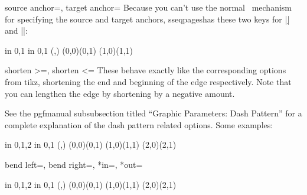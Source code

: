 \documentclass{ltxdoc}
\newenvironment{manualentry}[1]{
    \begin{pgfmanualentry}
    \pgfmanualentryheadline{#1}
    \pgfmanualbody
}{
    \end{pgfmanualentry}
}
\def\sseqpages{sseqpages}
\begin{document}
\begin{sseqdata}[name=ex1,degree={#1}{1-#1}]
\begin{keylist}{source anchor=, target anchor=}
Because you can't use the normal \tikzname\ mechanism for specifying the source and target anchors, \sseqpages\space has these two keys for |\d| and |\structline|:
\begin{codeexample}[width=6cm]
\begin{sseqpage}[no axes]
\foreach\x in {0,1} \foreach\y in {0,1}{
    \class(\x,\y)
}
\structline(0,0)(0,1)
\structline[source anchor=north west,target anchor=-30](1,0)(1,1)
\end{sseqpage}
\end{codeexample}
\end{keylist}


\begin{keylist}{shorten >=, shorten <=}
These behave exactly like the corresponding options from tikz, shortening the end and beginning of the edge respectively. Note that you can lengthen the edge by shortening by a negative amount.
\end{keylist}

\begin{manualentry}{Dash patterns:}
See the pgfmanual subsubsection titled ``Graphic Parameters: Dash Pattern'' for a complete explanation of the dash pattern related options. Some examples:
\begin{codeexample}[width=6cm]
\begin{sseqpage}[no axes]
\foreach\x in {0,1,2} \foreach\y in {0,1}{
    \class(\x,\y)
}
(0,0)(0,1)
(1,0)(1,1)
(2,0)(2,1)
\end{sseqpage}
\end{codeexample}
%
\end{manualentry}

\begin{keylist}{bend left=, bend right=, *in=, *out=}
\begin{codeexample}[width=6cm]
\begin{sseqpage}[no axes]
\foreach\x in {0,1,2} \foreach\y in {0,1}{
    \class(\x,\y)
}
\structline[bend left=20](0,0)(0,1)
\structline[bend right=20](1,0)(1,1)
\structline[in=20,out=north](2,0)(2,1)
\end{sseqpage}
\end{codeexample}
\end{keylist}


\end{sseqdata}
\end{document}

